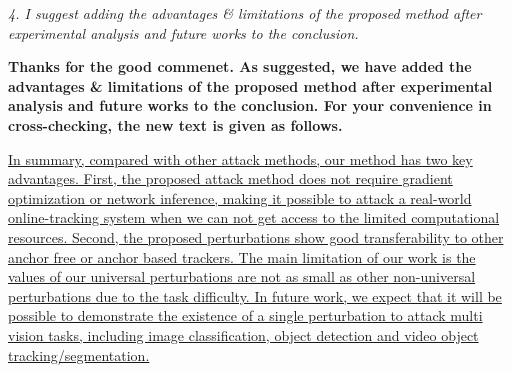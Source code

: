 \documentclass[12pt]{article}
\begin{document}
\textit{4. I suggest adding the advantages \& limitations of the proposed method after experimental analysis and future works to the conclusion.}

\textbf{Thanks for the good commenet. As suggested, we have added the advantages \& limitations of the proposed method after experimental analysis and future works to the conclusion. For your convenience in cross-checking, the new text is given as follows.}

\uline{
In summary, compared with other attack methods, our method has two key advantages. First,
the proposed attack method does not require gradient optimization or network inference, making it possible to attack a real-world online-tracking system when we can not get access to the limited computational resources.
Second, the proposed perturbations show good transferability to other anchor free or anchor based trackers. 
The main limitation of our work is the values of our universal perturbations are not as small as other non-universal perturbations due to the task difficulty.
  In future work, we expect that it will be possible to demonstrate the existence of a single perturbation to attack multi vision tasks, including image classification, object detection and video object tracking/segmentation.
}
\end{document}
